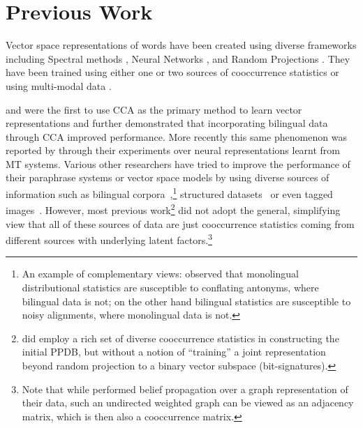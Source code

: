\documentclass[11pt]{article}
\begin{document}
\section{Previous Work}
\label{sec:previouswork}
Vector space representations of words have been created using diverse
 frameworks including Spectral methods
 \cite{dhillon2011multi,dhillon2012two},
 Neural Networks
 \cite{mikolov2013linguistic,collobert2013word}, and Random Projections \cite{ravichandranACL05,bhagatACL08,chanGEMS2011}.
 They have been trained using either one
 \cite{pennington2014glove}
 or two sources of cooccurrence statistics
 \cite{zou2013bilingual,faruqui2014improving,bansal2014tailoring,levy2014dependency}
 or using multi-modal data
 \cite{felix2014learning,bruni2012distributional}.
 
 and  were the first to use
CCA as the primary method to learn vector representations and
 further demonstrated that incorporating bilingual
data through CCA improved performance. More recently this same
phenomenon was reported by  through their
experiments over neural representations learnt from MT systems.
Various other researchers have tried to improve the performance of
their paraphrase systems or vector space models by using diverse
sources of information such as bilingual
corpora~\cite{bannard2005paraphrasing,Huang2012Improving,zou2013bilingual},\footnote{An
  example of complementary views:  observed that
  monolingual distributional statistics are susceptible to conflating
  antonyms, where bilingual data is not; on the other hand bilingual
  statistics are susceptible to noisy alignments, where monolingual
  data is not.}  structured
datasets~\cite{yu2014improving,faruqui2014retrofitting} or even tagged
images~\cite{bruni2012distributional}. However, most previous
work\footnote{ did employ a rich set of
  diverse cooccurrence statistics in constructing the initial PPDB, but without a notion of
  ``training'' a joint representation beyond random projection to a binary
  vector subspace (bit-signatures).} did not adopt the general,
simplifying view that all of these sources of data are just
cooccurrence statistics coming from different sources with underlying
latent factors.\footnote{Note that while
   performed belief propagation over
  a graph representation of their data, such an undirected weighted
  graph can be viewed as an adjacency matrix, which is then also a
  cooccurrence matrix.}
\end{document}
